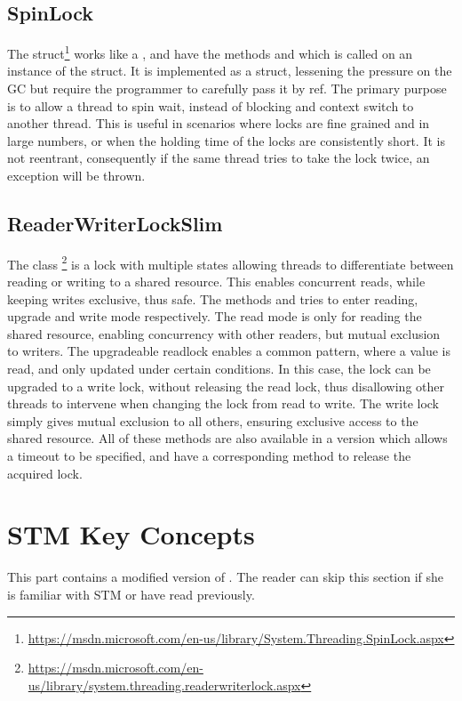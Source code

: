 \subsection{SpinLock}
The  struct\footnote{\url{https://msdn.microsoft.com/en-us/library/System.Threading.SpinLock.aspx}} works like a , and have the methods   and  which is called on an instance of the struct. It is implemented as a struct, lessening the pressure on the \ac{GC} but require the programmer to carefully pass it by ref. The primary purpose is to allow a thread to spin wait, instead of blocking and context switch to another thread. This is useful in scenarios where locks are fine grained and in large numbers, or when the holding  time of the locks are consistently short. It is not reentrant, consequently if the same thread tries to take the lock twice, an exception will be thrown. 

\subsection{ReaderWriterLockSlim}
The class \footnote{\url{https://msdn.microsoft.com/en-us/library/system.threading.readerwriterlock.aspx}} is a lock with multiple states allowing threads to differentiate between reading or writing to a shared resource. This enables concurrent reads, while keeping writes exclusive, thus safe. The methods   and  tries to enter reading, upgrade and write mode respectively. The read mode is only for reading the shared resource, enabling concurrency with other readers, but mutual exclusion to writers. The upgradeable readlock enables a common pattern, where a value is read, and only updated under certain conditions. In this case, the lock can be upgraded to a write lock, without releasing the read lock, thus disallowing other threads to intervene when changing the lock from read to write. The write lock simply gives mutual exclusion to all others, ensuring exclusive access to the shared resource. All of these methods are also available in a version which allows a timeout to be specified, and have a corresponding  method to release the acquired lock.

\section{STM Key Concepts}
This part contains a modified version of \cite[p. 43-48]{dpt907e14trending}. The reader can skip this section if she is familiar with \ac{STM} or have read \cite[chap. 5]{dpt907e14trending} previously.
\label{chap:stm_key_concepts}

